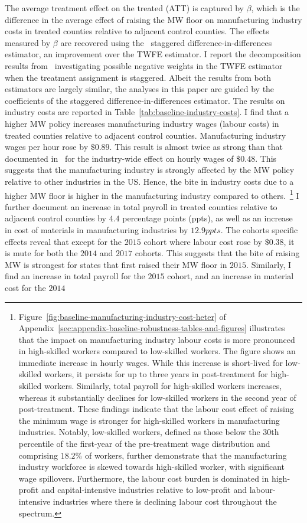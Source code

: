 \documentclass[12pt, english]{article}
\begin{document}
    The average treatment effect on the treated (ATT) is captured by $\beta$, which is the difference in the average effect of raising the MW floor on manufacturing industry costs in treated counties relative to adjacent control counties. The effects measured by $\beta$ are recovered using the~\cite{sun2021estimating} staggered difference-in-differences estimator, an improvement over the TWFE estimator. I report the decomposition results from~\cite{de2020two} investigating possible negative weights in the TWFE estimator when the treatment assignment is staggered. Albeit the results from both estimators are largely similar, the analyses in this paper are guided by the coefficients of the staggered difference-in-differences estimator. The results on industry costs are reported in Table~\ref{tab:baseline-industry-costs}. I find that a higher MW policy increases manufacturing industry wages (labour costs) in treated counties relative to adjacent control counties. Manufacturing industry wages per hour rose by $\$0.89$. This result is almost twice as strong than that documented in~\cite{gopalan2021state} for the industry-wide effect on hourly wages of $\$0.48$. This suggests that the manufacturing industry is strongly affected by the MW policy relative to other industries in the US. Hence, the bite in industry costs due to a higher MW floor is higher in the manufacturing industry compared to others.~\footnote{\tiny Figure~\ref{fig:baseline-manufacturing-industry-cost-heter} of Appendix~\ref{sec:appendix-baseline-robustness-tables-and-figures} illustrates that the impact on manufacturing industry labour costs is more pronounced in high-skilled workers compared to low-skilled workers. The figure shows an immediate increase in hourly wages. While this increase is short-lived for low-skilled workers, it persists for up to three years in post-treatment for high-skilled workers. Similarly, total payroll for high-skilled workers increases, whereas it substantially declines for low-skilled workers in the second year of post-treatment. These findings indicate that the labour cost effect of raising the minimum wage is stronger for high-skilled workers in manufacturing industries. Notably, low-skilled workers, defined as those below the 30th percentile of the first-year of the pre-treatment wage distribution and comprising $18.2\%$ of workers, further demonstrate that the manufacturing industry workforce is skewed towards high-skilled worker, with significant wage spillovers. Furthermore, the labour cost burden is dominated in high-profit and capital-intensive industries relative to low-profit and labour-intensive industries where there is declining labour cost throughout the spectrum.} I further document an increase in total payroll in treated counties relative to adjacent control counties by $4.4$ percentage points (ppts), as well as an increase in cost of materials in manufacturing industries by $12.9ppts$. The cohorts specific effects reveal that except for the $2015$ cohort where labour cost rose by $\$0.38$, it is mute for both the $2014$ and $2017$ cohorts. This suggests that the bite of raising MW is strongest for states that first raised their MW floor in $2015$. Similarly, I find an increase in total payroll for the $2015$ cohort, and an increase in material cost for the $2014$ 
\end{document}
